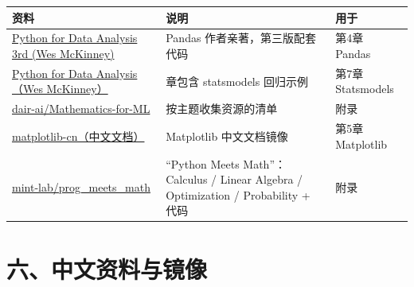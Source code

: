 {\def\LTcaptype{none} %
\begin{longtable}[]{@{}
  >{\raggedright\arraybackslash}p{}
  >{\raggedright\arraybackslash}p{}
  >{\raggedright\arraybackslash}p{}@{}}
\toprule\noalign{}
\begin{minipage}[b]{\linewidth}\raggedright
资料
\end{minipage} & \begin{minipage}[b]{\linewidth}\raggedright
说明
\end{minipage} & \begin{minipage}[b]{\linewidth}\raggedright
用于
\end{minipage} \\
\midrule\noalign{}
\endhead
\bottomrule\noalign{}
\endlastfoot
\href{https://github.com/wesm/pydata-book}{Python for Data Analysis 3rd
(Wes McKinney)} & Pandas 作者亲著，第三版配套代码 & 第4章 Pandas \\
\href{https://github.com/wesm/pydata-book}{Python for Data Analysis（Wes
McKinney）} & 14 章包含 statsmodels 回归示例 & 第7章 Statsmodels \\
\href{https://github.com/dair-ai/Mathematics-for-ML}{dair-ai/Mathematics-for-ML}
& 按主题收集资源的清单 & 附录 \\
\href{https://github.com/tomdonald/matplotlib-cn}{matplotlib-cn（中文文档）}
& Matplotlib 中文文档镜像 & 第5章 Matplotlib \\
\href{https://github.com/mint-lab/prog_meets_math}{mint-lab/prog\_meets\_math}
& ``Python Meets Math''：Calculus / Linear Algebra / Optimization /
Probability + 代码 & 附录 \\
\end{longtable}
}

\section{六、中文资料与镜像}\label{ux516dux4e2dux6587ux8d44ux6599ux4e0eux955cux50cf}

